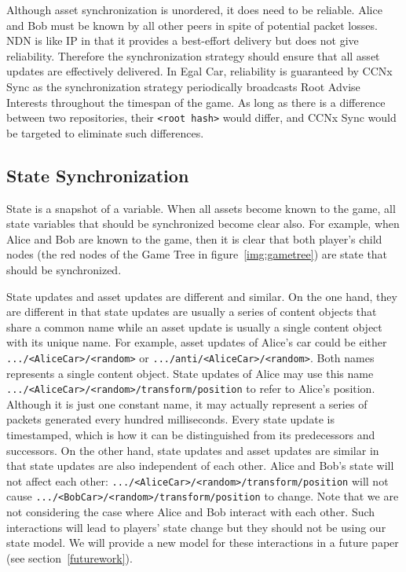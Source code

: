\documentclass{article}
\begin{document}
Although asset synchronization is unordered, it does need to be reliable. Alice and Bob must be known by all other peers in spite of potential packet losses. NDN is like IP in that it provides a best-effort delivery but does not give reliability. Therefore the synchronization strategy should ensure that all asset updates are effectively delivered. In Egal Car, reliability is guaranteed by CCNx Sync as the synchronization strategy periodically broadcasts Root Advise Interests throughout the timespan of the game. As long as there is a difference between two repositories, their \texttt{<root hash>} would differ, and CCNx Sync would be targeted to eliminate such differences.

\subsection{State Synchronization}
\label{statesynchronization}

State is a snapshot of a variable. When all assets become known to the game, all state variables that should be synchronized become clear also. For example, when Alice and Bob are known to the game, then it is clear that both player's child nodes (the red nodes of the Game Tree in figure~\ref{img:gametree}) are state that should be synchronized. 

State updates and asset updates are different and similar. On the one hand, they are different in that state updates are usually a series of content objects that share a common name while an asset update is usually a single content object with its unique name. For example, asset updates of Alice's car could be either \texttt{.../<AliceCar>/<random>} or \texttt{.../anti/<AliceCar>/<random>}. Both names represents a single content object. State updates of Alice may use this name \texttt{.../<AliceCar>/<random>/transform/position} to refer to Alice's position. Although it is just one constant name, it may actually represent a series of packets generated every hundred milliseconds. Every state update is timestamped, which is how it can be distinguished from its predecessors and successors. On the other hand, state updates and asset updates are similar in that state updates are also independent of each other. Alice and Bob's state will not affect each other: \texttt{.../<AliceCar>/<random>/transform/position} will not cause \texttt{.../<BobCar>/<random>/transform/position} to change. Note that we are not considering the case where Alice and Bob interact with each other. Such interactions will lead to players' state change but they should not be using our state model. We will provide a new model for these interactions in a future paper (see section~\ref{futurework}).
\end{document}
